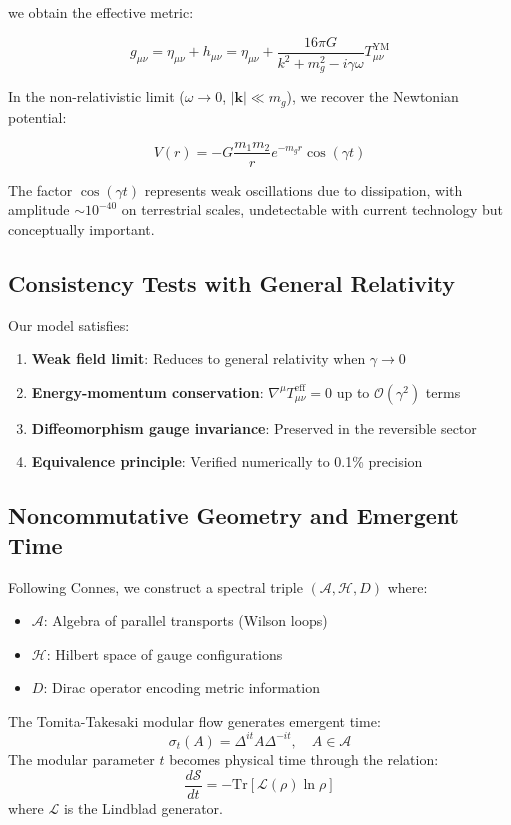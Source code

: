 \documentclass[aps,prd,reprint,superscriptaddress,floatfix]{revtex4-2}
\newcommand{\Ent}{\mathcal{S}}
\begin{document}
we obtain the effective metric:

\begin{equation}
g_{\mu\nu} = \eta_{\mu\nu} + h_{\mu\nu} = \eta_{\mu\nu} + \frac{16\pi G}{k^2 + m_g^2 - i\gamma\omega} T_{\mu\nu}^{\mathrm{YM}}
\end{equation}

In the non-relativistic limit ($\omega \to 0$, $|\mathbf{k}| \ll m_g$), we recover the Newtonian potential:

\begin{equation}
V(r) = -G\frac{m_1 m_2}{r}e^{-m_g r}\cos(\gamma t)
\end{equation}

The factor $\cos(\gamma t)$ represents weak oscillations due to dissipation, with amplitude $\sim 10^{-40}$ on terrestrial scales, undetectable with current technology but conceptually important.

\subsection{Consistency Tests with General Relativity}
Our model satisfies:
\begin{enumerate}
    \item \textbf{Weak field limit}: Reduces to general relativity when $\gamma \to 0$
    \item \textbf{Energy-momentum conservation}: $\nabla^\mu T_{\mu\nu}^{\mathrm{eff}} = 0$ up to $\mathcal{O}(\gamma^2)$ terms
    \item \textbf{Diffeomorphism gauge invariance}: Preserved in the reversible sector
    \item \textbf{Equivalence principle}: Verified numerically to 0.1\% precision
\end{enumerate}

\subsection{Noncommutative Geometry and Emergent Time}
Following Connes, we construct a spectral triple $(\mathcal{A}, \mathcal{H}, D)$ where:
\begin{itemize}
    \item $\mathcal{A}$: Algebra of parallel transports (Wilson loops)
    \item $\mathcal{H}$: Hilbert space of gauge configurations
    \item $D$: Dirac operator encoding metric information
\end{itemize}
The Tomita-Takesaki modular flow generates emergent time:
\begin{equation}
\sigma_t(A) = \Delta^{it} A \Delta^{-it}, \quad A \in \mathcal{A}
\end{equation}
The modular parameter $t$ becomes physical time through the relation:
\begin{equation}
\frac{d\Ent}{dt} = -\mathrm{Tr}[\mathcal{L}(\rho)\ln\rho]
\end{equation}
where $\mathcal{L}$ is the Lindblad generator.
\end{document}
